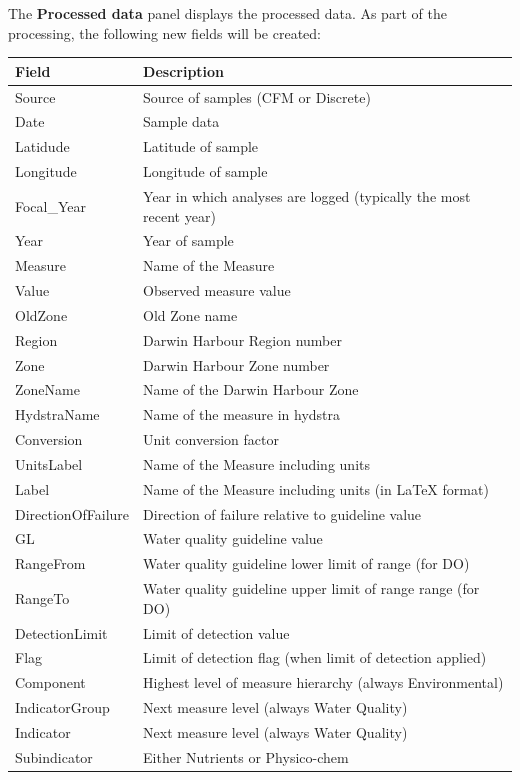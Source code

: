 \documentclass[
  8pt,
  a4paper]{article}
\begin{document}
The \textbf{Processed data} panel displays the processed data. As part
of the processing, the following new fields will be created:

\begin{longtable}[]{@{}
  >{\raggedright\arraybackslash}p{}
  >{\raggedright\arraybackslash}p{}@{}}
\toprule\noalign{}
\begin{minipage}[b]{\linewidth}\raggedright
Field
\end{minipage} & \begin{minipage}[b]{\linewidth}\raggedright
Description
\end{minipage} \\
\midrule\noalign{}
\endhead
\bottomrule\noalign{}
\endlastfoot
Source & Source of samples (CFM or Discrete) \\
Date & Sample data \\
Latidude & Latitude of sample \\
Longitude & Longitude of sample \\
Focal\_Year & Year in which analyses are logged (typically the most
recent year) \\
Year & Year of sample \\
Measure & Name of the Measure \\
Value & Observed measure value \\
OldZone & Old Zone name \\
Region & Darwin Harbour Region number \\
Zone & Darwin Harbour Zone number \\
ZoneName & Name of the Darwin Harbour Zone \\
HydstraName & Name of the measure in hydstra \\
Conversion & Unit conversion factor \\
UnitsLabel & Name of the Measure including units \\
Label & Name of the Measure including units (in LaTeX format) \\
DirectionOfFailure & Direction of failure relative to guideline value \\
GL & Water quality guideline value \\
RangeFrom & Water quality guideline lower limit of range (for DO) \\
RangeTo & Water quality guideline upper limit of range range (for DO) \\
DetectionLimit & Limit of detection value \\
Flag & Limit of detection flag (when limit of detection applied) \\
Component & Highest level of measure hierarchy (always Environmental) \\
IndicatorGroup & Next measure level (always Water Quality) \\
Indicator & Next measure level (always Water Quality) \\
Subindicator & Either Nutrients or Physico-chem \\
\end{longtable}
\end{document}
